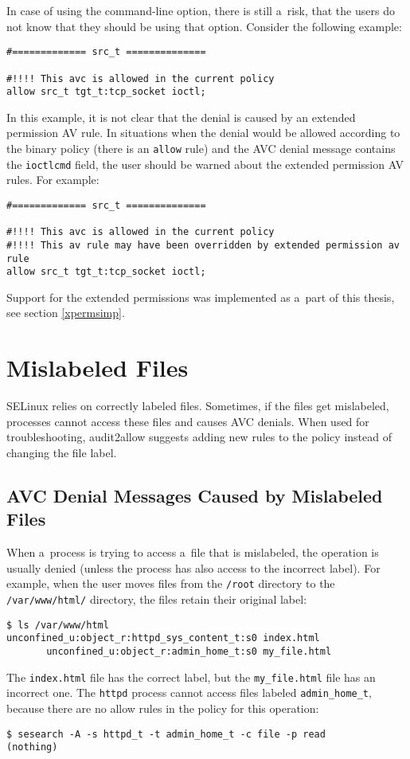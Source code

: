 In case of using the command-line option, there is still a~risk, that the users
do not know that they should be using that option. Consider the following
example:
\begin{lstlisting}
#============= src_t ==============

#!!!! This avc is allowed in the current policy
allow src_t tgt_t:tcp_socket ioctl;
\end{lstlisting}
In this example, it is not clear that the denial is caused by an extended
permission AV rule. In situations when the denial would be allowed according to
the binary policy (there is an \texttt{allow} rule) and the AVC denial message
contains the \texttt{ioctlcmd} field, the user should be warned about the
extended permission AV rules. For example:
\begin{lstlisting}
#============= src_t ==============

#!!!! This avc is allowed in the current policy
#!!!! This av rule may have been overridden by extended permission av rule
allow src_t tgt_t:tcp_socket ioctl;
\end{lstlisting}
Support for the extended permissions was implemented as a~part of this thesis,
see section \ref{xpermsimp}.

\section{Mislabeled Files}
\label{mislabeled}
SELinux relies on correctly labeled files. Sometimes, if the files get
mislabeled, processes cannot access these files and causes AVC denials. When
used for troubleshooting, audit2allow suggests adding new rules to the policy
instead of changing the file label.

\subsection{AVC Denial Messages Caused by Mislabeled Files}
When a~process is trying to access a~file that is mislabeled, the operation is
usually denied (unless the process has also access to the incorrect label). For
example, when the user moves files from the \texttt{/root} directory to the
\texttt{/var/www/html/} directory, the files retain their original label:
\begin{lstlisting}
$ ls /var/www/html
unconfined_u:object_r:httpd_sys_content_t:s0 index.html
       unconfined_u:object_r:admin_home_t:s0 my_file.html
\end{lstlisting}
The \texttt{index.html} file has the correct label, but the
\texttt{my\_file.html} file has an incorrect one. The \texttt{httpd} process
cannot access files labeled \texttt{admin\_home\_t}, because there are no allow
rules in the policy for this operation:
\begin{lstlisting}
$ sesearch -A -s httpd_t -t admin_home_t -c file -p read
(nothing)
\end{lstlisting}

